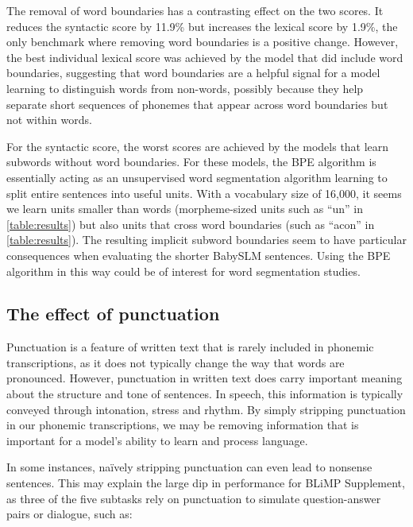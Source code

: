 The removal of word boundaries has a contrasting effect on the two scores. It reduces the syntactic score by 11.9\% but increases the lexical score by 1.9\%, the only benchmark where removing word boundaries is a positive change. However, the best individual lexical score was achieved by the model that did include word boundaries, suggesting that word boundaries are a helpful signal for a model learning to distinguish words from non-words, possibly because they help separate short sequences of phonemes that appear across word boundaries but not within words. 


For the syntactic score, the worst scores are achieved by the models that learn subwords without word boundaries. For these models, the BPE algorithm is essentially acting as an unsupervised word segmentation algorithm learning to split entire sentences into useful units. With a vocabulary size of 16,000, it seems we learn units smaller than words (morpheme-sized units such as ``un'' in \cref{table:results}) but also units that cross word boundaries (such as ``acon'' in \cref{table:results}). The resulting implicit subword boundaries seem to have particular consequences when evaluating the shorter BabySLM sentences. Using the BPE algorithm in this way could be of interest for word segmentation studies. 

\subsection{The effect of punctuation}
\label{sec:14-punctuation}

Punctuation is a feature of written text that is rarely included in phonemic transcriptions, as it does not typically change the way that words are pronounced. However, punctuation in written text does carry important meaning about the structure and tone of sentences. In speech, this information is typically conveyed through intonation, stress and rhythm. By simply stripping punctuation in our phonemic transcriptions, we may be removing information that is important for a model's ability to learn and process language. 

In some instances, na\"ively stripping punctuation can even lead to nonsense sentences. This may explain the large dip in performance for BLiMP Supplement, as three of the five subtasks rely on punctuation to simulate question-answer pairs or dialogue, such as:

